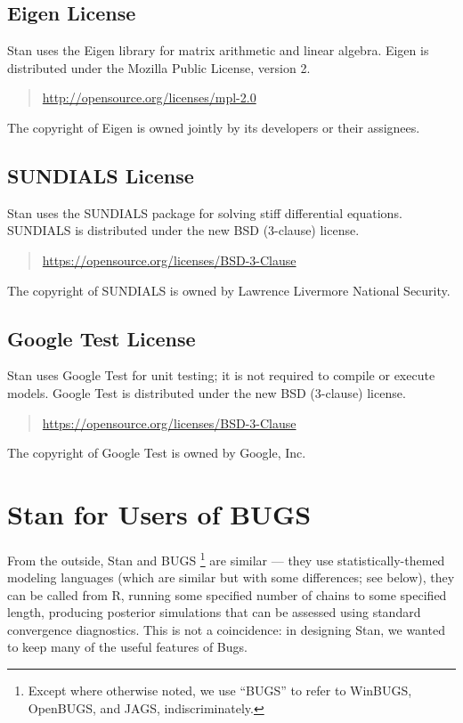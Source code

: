 \section{Eigen License}

Stan uses the Eigen library for matrix arithmetic and linear algebra.
Eigen is distributed under the Mozilla Public License, version 2.
%
\begin{quote}
\url{http://opensource.org/licenses/mpl-2.0}
\end{quote}
%
The copyright of Eigen is owned jointly by its developers or their
assignees.

\section{SUNDIALS License}

Stan uses the SUNDIALS package for solving stiff differential
equations.  SUNDIALS is distributed under the new BSD (3-clause) license.
%
\begin{quote}
\url{https://opensource.org/licenses/BSD-3-Clause}
\end{quote}
%
The copyright of SUNDIALS is owned by Lawrence Livermore National
Security.

\section{Google Test License}

Stan uses Google Test for unit testing; it is not required to compile
or execute models.  Google Test is distributed under the new BSD (3-clause)
license.
%
\begin{quote}
\url{https://opensource.org/licenses/BSD-3-Clause}
\end{quote}
%
The copyright of Google Test is owned by Google, Inc.


\chapter{Stan for Users of BUGS}\label{stan-for-bugs.appendix}

From the outside, Stan and BUGS%
%
\footnote{Except where otherwise noted, we use ``BUGS'' to refer to
  WinBUGS, OpenBUGS, and JAGS, indiscriminately.}
%
are similar --- they use statistically-themed modeling languages
(which are similar but with some differences; see below), they can be
called from R, running some specified number of chains to some
specified length, producing posterior simulations that can be assessed
using standard convergence diagnostics.  This is not a coincidence:
in designing Stan, we wanted to keep many of the useful features of
Bugs.

